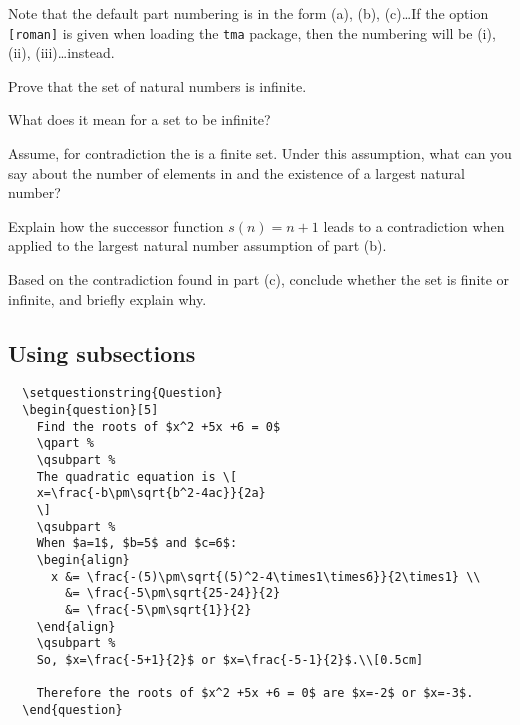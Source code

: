 \documentclass[a4paper,11pt,twoside]{article}
\begin{document}
Note that the default part numbering is in the form (a), (b), (c)\dots If the option \verb|[roman]| is given when loading the \verb|tma| package, then the numbering will be (i), (ii), (iii)\dots instead.

\begin{center}
\begin{minipage}{0.7\textwidth}
\begin{question}[4]
  Prove that the set \N{} of natural numbers is infinite.
  
  \qpart
    What does it mean for a set to be infinite?
    
  \qpart
    Assume, for contradiction the \N{} is a finite set. 
    Under this assumption, what can you say about the 
    number of elements in \N{} and the existence of a 
    largest natural number?
    
  \qpart
    Explain how the successor function $s(n) = n + 1$ 
    leads to a contradiction when applied to the largest 
    natural number assumption of part (b).
    
  \qpart
    Based on the contradiction found in part (c), conclude 
    whether the set \N{} is finite or infinite, and briefly 
    explain why.
\end{question}
\end{minipage}
\end{center}

\subsection{Using subsections}

\begin{verbatim}
  \setquestionstring{Question}
  \begin{question}[5]
    Find the roots of $x^2 +5x +6 = 0$
    \qpart %
    \qsubpart %
    The quadratic equation is \[
    x=\frac{-b\pm\sqrt{b^2-4ac}}{2a} 
    \]
    \qsubpart %
    When $a=1$, $b=5$ and $c=6$:
    \begin{align}
      x &= \frac{-(5)\pm\sqrt{(5)^2-4\times1\times6}}{2\times1} \\
        &= \frac{-5\pm\sqrt{25-24}}{2}
        &= \frac{-5\pm\sqrt{1}}{2}
    \end{align}
    \qsubpart %
    So, $x=\frac{-5+1}{2}$ or $x=\frac{-5-1}{2}$.\\[0.5cm]
		
    Therefore the roots of $x^2 +5x +6 = 0$ are $x=-2$ or $x=-3$.
  \end{question}
\end{verbatim}
\end{document}
